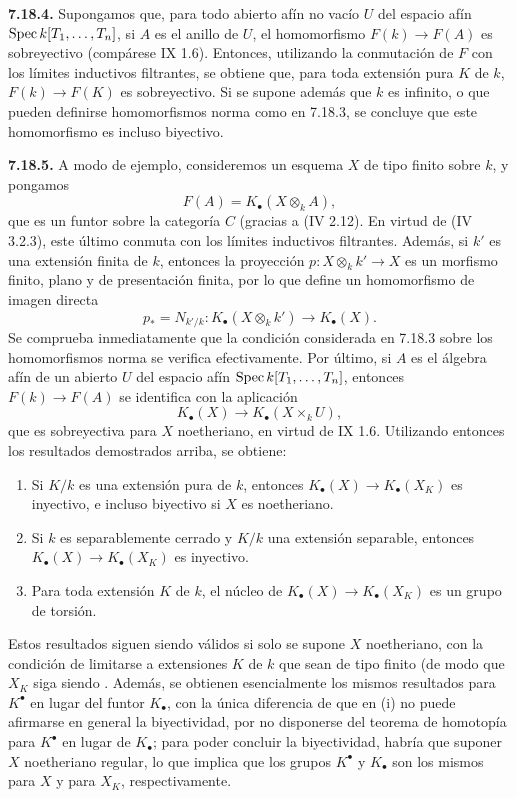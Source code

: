 \textbf{7.18.4.} Supongamos que, para todo abierto afín no vacío \(U\) del espacio afín \(\operatorname{Spec} k[T_1,\ldots,T_n]\), si \(A\) es el anillo de \(U\), el homomorfismo \(F(k)\to F(A)\) es sobreyectivo (compárese IX 1.6). Entonces, utilizando la conmutación de \(F\) con los límites inductivos filtrantes, se obtiene que, para toda extensión pura \(K\) de \(k\), \(F(k)\to F(K)\) es sobreyectivo. Si se supone además que \(k\) es infinito, o que pueden definirse homomorfismos norma como en 7.18.3, se concluye que este homomorfismo es incluso biyectivo.

\textbf{7.18.5.} A modo de ejemplo, consideremos un esquema \(X\) de tipo finito sobre \(k\), y pongamos
\[
  F(A)=K_\bullet(X\otimes_k A),
\]
que es un funtor sobre la categoría \(C\) (gracias a (IV 2.12)\sisi{}{)}. En virtud de (IV 3.2.3), este último conmuta con los límites inductivos filtrantes. Además, si \(k'\) es una extensión finita de \(k\), entonces la proyección \(p:X\otimes_k k'\to X\) es un morfismo finito, plano y de presentación finita, por lo que define un homomorfismo de imagen directa %
\[
  p_*=N_{k'/k}:K_\bullet(X\otimes_k k')\longrightarrow K_\bullet(X).
\]
Se comprueba inmediatamente que la condición considerada en 7.18.3 sobre los homomorfismos norma se verifica efectivamente. Por último, si \(A\) es el álgebra afín de un abierto \(U\) del espacio afín \(\operatorname{Spec} k[T_1,\ldots,T_n]\), entonces \(F(k)\to F(A)\) se identifica con la aplicación
\[
  K_\bullet(X)\longrightarrow K_\bullet(X\times_k U),
\]
que es sobreyectiva para \(X\) noetheriano, en virtud de IX 1.6. Utilizando entonces los resultados demostrados arriba, se obtiene:
\begin{enumerate}[label=(\roman*)]
\item Si \(K/k\) es una extensión pura de \(k\), entonces \(K_\bullet(X)\longrightarrow K_\bullet(X_K)\) es inyectivo, e incluso biyectivo si \(X\) es noetheriano.
\item Si \(k\) es separablemente cerrado y \(K/k\) una extensión separable, entonces \(K_\bullet(X)\longrightarrow K_\bullet(X_K)\) es inyectivo.
\item Para toda extensión \(K\) de \(k\), el núcleo de \(K_\bullet(X)\longrightarrow K_\bullet(X_K)\) es un grupo de torsión.
\end{enumerate}
Estos resultados siguen siendo válidos si solo se supone \(X\) noetheriano, con la condición de limitarse a extensiones \(K\) de \(k\) que sean de tipo finito (de modo que \(X_K\) siga siendo \sisi{}{)}. Además, se obtienen esencialmente los mismos resultados para \(K^\bullet\) en lugar del funtor \(K_\bullet\), con la única diferencia de que en (i) no puede afirmarse en general la biyectividad, por no disponerse del teorema de homotopía para \(K^\bullet\) en lugar de \(K_\bullet\); para poder concluir la biyectividad, habría que suponer \(X\) noetheriano regular, lo que implica que los grupos \(K^\bullet\) y \(K_\bullet\) son los mismos para \(X\) y para \(X_K\), respectivamente. %

